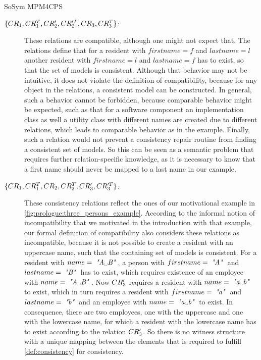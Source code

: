 \begin{copiedFrom}{SoSym MPM4CPS}
\begin{example}
\begin{description}
\item[$\{ CR_{1}, CR^T_{1}, CR'_{2}, CR'^T_{2}, CR_{3}, CR^T_{3} \}$:]
These relations are compatible, although one might not expect that. The relations define that for a resident with $firstname = f$ and $lastname = l$ another resident with $firstname = l$ and $lastname = f$ has to exist, so that the set of models is consistent.
Although that behavior may not be intuitive, it does not violate the definition of compatibility, because for any object in the relations, a consistent model can be constructed.
In general, such a behavior cannot be forbidden, because comparable behavior might be expected, such as that for a software component an implementation class as well a utility class with different names are created due to different relations, which leads to comparable behavior as in the example.
Finally, such a relation would not prevent a consistency repair routine from finding a consistent set of models.
So this can be seen as a semantic problem that requires further relation-specific knowledge, as it is necessary to know that a first name should never be mapped to a last name in our example.

\item[$\{ CR_{1}, CR^T_{1}, CR_{2}, CR^T_{2}, CR'_{3}, CR'^T_{3} \}$:]
These consistency relations reflect the ones of our motivational example in \autoref{fig:prologue:three_persons_example}.
According to the informal notion of incompatibility that we motivated in the introduction with that example, our formal definition of compatibility also considers these relations as incompatible, because it is not possible to create a resident with an uppercase name, such that the containing set of models is consistent.
For a resident with $name = \mathtext{"A\textvisiblespace B"}$, a person with $firstname = \; \textit{"A"} \;$ and $lastname = \; \textit{"B"} \;$ has to exist, which requires existence of an employee with $name = \mathtext{"A\textvisiblespace B"}$. Now $CR'_{3}$ requires a resident with $name = \mathtext{"a\textvisiblespace b"}$ to exist, which in turn requires a resident with $firstname = \; \textit{"a"} \;$ and $lastname = \; \textit{"b"} \;$ and an employee with $name = \mathtext{"a\textvisiblespace b"}$ to exist.
In consequence, there are two employees, one with the uppercase and one with the lowercase name, for which a resident with the lowercase name has to exist according to the relation $CR'_{3}$. So there is no witness structure with a unique mapping between the elements that is required to fulfill \autoref{def:consistency} for consistency.
\end{description}
\end{example}


\end{copiedFrom}
